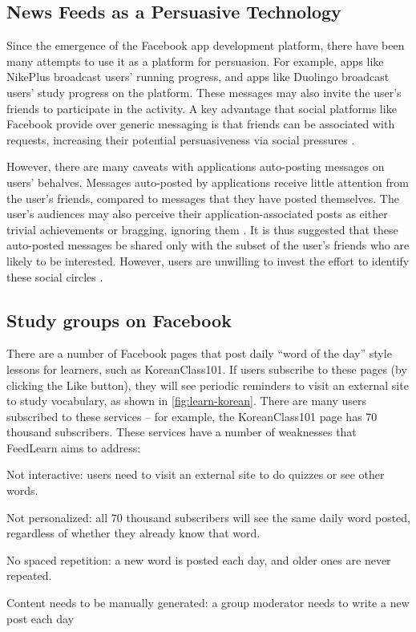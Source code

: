 \documentclass{chi-ext}
\begin{document}
\subsection{News Feeds as a Persuasive Technology}

Since the emergence of the Facebook app development platform, there have been
many attempts to use it as a platform for persuasion. For example, apps like NikePlus broadcast users' running progress, and apps like Duolingo broadcast users' study progress on the platform. These messages may also invite the user's friends to participate in the activity. A key advantage that social platforms like Facebook provide over generic messaging is that friends can be associated with requests, increasing their potential persuasiveness via social pressures \cite{foggfacebook}.

However, there are many caveats with applications auto-posting messages on users' behalves. Messages auto-posted by applications receive little attention from the user's friends, compared to messages that they have posted themselves. The user's audiences may also perceive their application-associated posts as either trivial achievements or bragging, ignoring them \cite{socialsharing}. It is thus suggested that these auto-posted messages be shared only with the subset of the user's friends who are likely to be interested. However, users are unwilling to invest the effort to identify these social circles \cite{socialsharing}.

\subsection{Study groups on Facebook}

There are a number of Facebook pages that post daily ``word of the day'' style lessons for learners, such as KoreanClass101. If users subscribe to these pages (by clicking the Like button), they will see periodic reminders to visit an external site to study vocabulary, as shown in \autoref{fig:learn-korean}. There are many users subscribed to these services -- for example, the KoreanClass101 page has 70 thousand subscribers. These services have a number of weaknesses that FeedLearn aims to address:

\begin{compactitem}
\item Not interactive: users need to visit an external site to do quizzes or see other words.
\item Not personalized: all 70 thousand subscribers will see the same daily word posted, regardless of whether they already know that word.
\item No spaced repetition: a new word is posted each day, and older ones are never repeated.
\item Content needs to be manually generated: a group moderator needs to write a new post each day
\end{compactitem}
\end{document}

